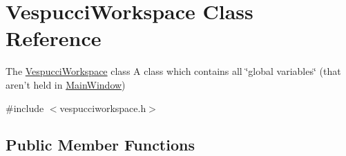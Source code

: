 \hypertarget{class_vespucci_workspace}{\section{Vespucci\+Workspace Class Reference}
\label{class_vespucci_workspace}
}


The \hyperlink{class_vespucci_workspace}{Vespucci\+Workspace} class A class which contains all \char`\"{}global variables\char`\"{} (that aren't held in \hyperlink{class_main_window}{Main\+Window})  




{\ttfamily \#include $<$vespucciworkspace.\+h$>$}

\subsection*{Public Member Functions}
